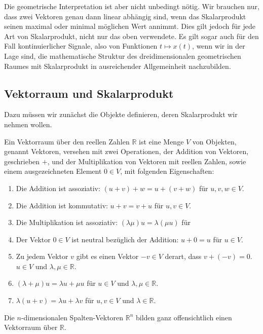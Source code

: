 Die geometrische Interpretation ist aber nicht unbedingt nötig.
Wir brauchen nur, dass zwei Vektoren genau dann linear abhängig sind,
wenn das Skalarprodukt seinen maximal oder minimal möglichen Wert annimmt.
Dies gilt jedoch für jede Art von Skalarprodukt, nicht nur das oben
verwendete.
Es gilt sogar auch für den Fall kontinuierlicher Signale, also von
Funktionen $t\mapsto x(t)$, wenn wir in der Lage sind, die mathematische
Struktur des dreidimensionalen geometrischen Raumes mit Skalarprodukt
in ausreichender Allgemeinheit nachzubilden.

\subsection{Vektorraum und Skalarprodukt}
Dazu müssen wir zunächst die Objekte definieren, deren Skalarprodukt wir
nehmen wollen.
\begin{definition}
Ein Vektorraum über den reellen Zahlen $\mathbb R$ ist eine Menge $V$ 
von Objekten, genannt Vektoren, versehen mit zwei Operationen, der
Addition von Vektoren, geschrieben $+$, und der Multiplikation von Vektoren
mit reellen Zahlen, sowie einem ausgezeichneten Element $0\in V$, mit
folgenden Eigenschaften:
\begin{enumerate}
\item Die Addition ist assoziativ: $(u+v)+w = u+(v+w)$ für $u,v,w\in V$.
\item Die Addition ist kommutativ: $u+v=v+u$ für $u,v\in V$.
\item Die Multiplikation ist assoziativ: $(\lambda \mu)u=\lambda (\mu u)$ für
\item Der Vektor $0\in V$ ist neutral bezüglich der Addition: $u+0=u$ für
$u\in V$.
\item Zu jedem Vektor $v$ gibt es einen Vektor $-v\in V$ derart, dass
$v+(-v)=0$.
$u\in V$ und $\lambda,\mu\in\mathbb R$.
\item $(\lambda + \mu) u = \lambda u + \mu u$ für $u\in V$ und
$\lambda,\mu\in \mathbb R$.
\item $\lambda (u + v) = \lambda u + \lambda v$ für $u,v\in V$ und
$\lambda\in\mathbb R$.
\end{enumerate}
\end{definition}
Die $n$-dimensionalen Spalten-Vektoren $\mathbb R^n$ bilden ganz offensichtlich
einen Vektorraum über $\mathbb R$.


